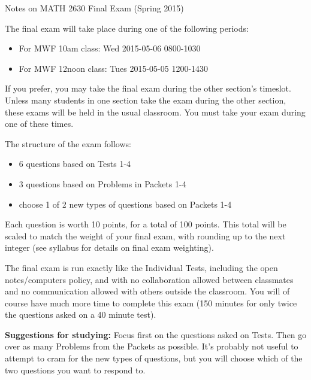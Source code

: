 \documentclass[letterpaper, twoside, 12pt]{book}
\begin{document}
{\Large Notes on MATH 2630 Final Exam (Spring 2015)}

The final exam will take place during one of the following periods:

\begin{itemize}
\item For MWF 10am class: Wed 2015-05-06 0800-1030
\item For MWF 12noon class: Tues 2015-05-05 1200-1430
\end{itemize}

If you prefer, you may take the final exam during the other section's
timeslot. Unless many students in one section take the exam during the
other section, these exams will be held in the usual classroom.
You must take your exam during one of these times.

The structure of the exam follows:

\begin{itemize}
  \item 6 questions based on Tests 1-4
  \item 3 questions based on Problems in Packets 1-4
  \item choose 1 of 2 new types of questions based on Packets 1-4
\end{itemize}

Each question is worth 10 points, for a total of 100 points. This total
will be scaled to match the weight of your final exam, with rounding up to
the next integer (see syllabus for details on final exam weighting).

The final exam is run exactly like the Individual Tests, including the open
notes/computers policy, and with no collaboration allowed between classmates
and no communication allowed with others outside the classroom. You will
of course have much more time to complete this exam (150 minutes for only twice
the questions asked on a 40 minute test).

\textbf{Suggestions for studying:} Focus first on the questions asked
on Tests. Then go over as many Problems from the Packets as possible.
It's probably not useful to attempt to cram for the new types of questions,
but you will choose which of the two questions you want to respond
to.
\end{document}
